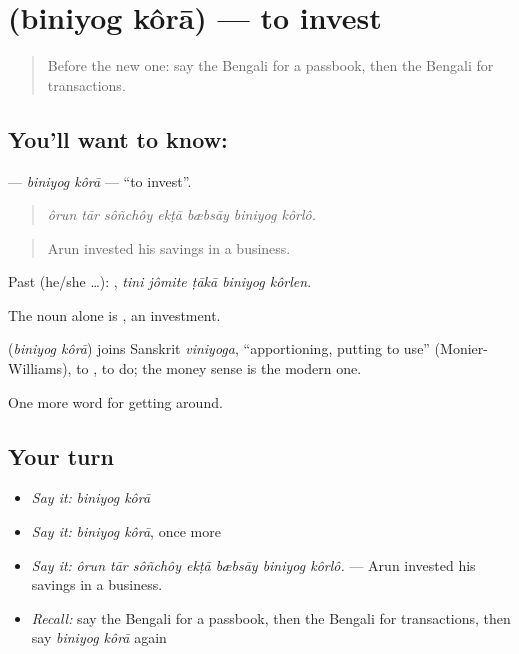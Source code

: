 \section[\texorpdfstring{\bn{বিনিয়োগ} \bn{করা} (biniyog kôrā)}{বিনিয়োগ করা (biniyog kôrā)}]{  (biniyog kôrā) — to invest}

\label{lesson:BN-C415-biniyog-kora}



\begin{quote}
Before the new one: say the Bengali for a passbook, then the Bengali for transactions.
\end{quote}

\subsection*{You'll want to know:  }
\textbf{ } — \emph{biniyog kôrā} — \textquotedblleft{}to invest\textquotedblright{}.

\begin{quote}
      
\end{quote}

\begin{quote}
\emph{ôrun tār sôñchôy ekṭā bæbsāy biniyog kôrlô.}
\end{quote}

\begin{quote}
Arun invested his savings in a business.
\end{quote}

Past (he/she …):     , \emph{tini jômite ṭākā biniyog kôrlen}.

The noun alone is , an investment.

\begin{cousinweb}
\textbf{ } (\emph{biniyog kôrā}) joins Sanskrit \emph{viniyoga}, \textquotedblleft{}apportioning, putting to use\textquotedblright{} (Monier-Williams), to , to do; the money sense is the modern one.
\end{cousinweb}

\begin{grammarlens}[title={What you've built}]
One more word for getting around.
\end{grammarlens}

\subsection*{Your turn}
\begin{itemize}
\raggedright
  \item \emph{Say it:} \emph{biniyog kôrā}
  \item \emph{Say it:} \emph{biniyog kôrā}, once more
  \item \emph{Say it:} \emph{ôrun tār sôñchôy ekṭā bæbsāy biniyog kôrlô.} — Arun invested his savings in a business.
  \item \emph{Recall:} say the Bengali for a passbook, then the Bengali for transactions, then say \emph{biniyog kôrā} again
\end{itemize}

